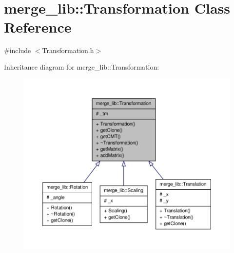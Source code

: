 \hypertarget{classmerge__lib_1_1_transformation}{\section{merge\-\_\-lib\-:\-:Transformation Class Reference}
\label{d9/d76/classmerge__lib_1_1_transformation}
}


{\ttfamily \#include $<$Transformation.\-h$>$}



Inheritance diagram for merge\-\_\-lib\-:\-:Transformation\-:
\nopagebreak
\begin{figure}[H]
\begin{center}
\leavevmode
\includegraphics[width=350pt]{d0/dc5/classmerge__lib_1_1_transformation__inherit__graph}
\end{center}
\end{figure}


